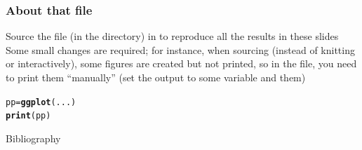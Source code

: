 \documentclass[aspectratio=169]{beamer}\usepackage[]{graphicx}\usepackage[]{xcolor}
\makeatletter
\newcommand{\hldef}[1]{\textcolor[rgb]{0.345,0.345,0.345}{#1}}%
\newcommand{\hlkwb}[1]{\textcolor[rgb]{0.69,0.353,0.396}{#1}}%
\newcommand{\hlkwd}[1]{\textcolor[rgb]{0.737,0.353,0.396}{\textbf{#1}}}%
\newenvironment{kframe}{%
 \def\at@end@of@kframe{}%
 \ifinner\ifhmode%
  \def\at@end@of@kframe{\end{minipage}}%
  \begin{minipage}{\columnwidth}%
 \fi\fi%
 \def\FrameCommand##1{\hskip\@totalleftmargin \hskip-\fboxsep
 \colorbox{shadecolor}{##1}\hskip-\fboxsep
     \hskip-\linewidth \hskip-\@totalleftmargin \hskip\columnwidth}%
 \MakeFramed {\advance\hsize-\width
   \@totalleftmargin\z@ \linewidth\hsize
   \@setminipage}}%
 {\par\unskip\endMakeFramed%
 \at@end@of@kframe}
\newenvironment{knitrout}{}{} %
\makeatother
\begin{document}
\begin{frame}[fragile]\frametitle{About that  file}
Source the file  (in the  directory) in  to reproduce all the results in these slides
\vfill
Some small changes are required; for instance, when sourcing (instead of knitting or interactively), some figures are created but not printed, so in the  file, you need to print them ``manually'' (set the output to some variable and  them)
\vfill
\begin{knitrout}
\color{fgcolor}\begin{kframe}
\begin{alltt}
\hldef{pp} \hlkwb{=} \hlkwd{ggplot}\hldef{(...)}
\hlkwd{print}\hldef{(pp)}
\end{alltt}
\end{kframe}
\end{knitrout}
\end{frame}


\begin{frame}{Bibliography}


\end{frame}
\end{document}
